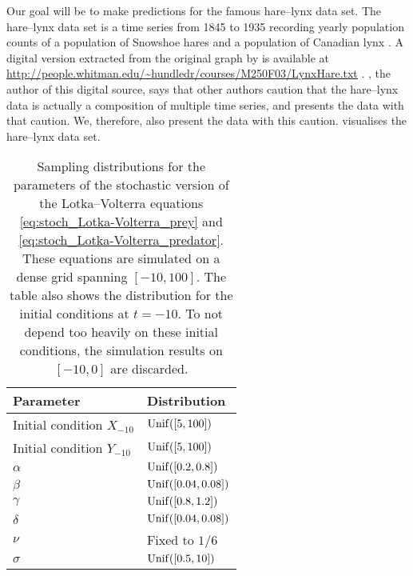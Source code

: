 \documentclass[12pt, twoside]{report}
\begin{document}
Our goal will be to make predictions for the famous hare--lynx data set.
The hare--lynx data set is a time series from 1845 to 1935 recording yearly population counts of a population of Snowshoe hares and a population of Canadian lynx \parencite{MacLulich:1937:Fluctuations_in_the_Numbers_of_the_Varying_Hare}.
A digital version extracted from the original graph by \textcite{MacLulich:1937:Fluctuations_in_the_Numbers_of_the_Varying_Hare}
is available at \url{http://people.whitman.edu/~hundledr/courses/M250F03/LynxHare.txt} \parencite{Hundley:2022:Introduction_to_Mathematical_Modelling}.
\Textcite{Hundley:2022:Introduction_to_Mathematical_Modelling},
the author of this digital source,
says that other authors caution that the hare--lynx data is actually a composition of multiple time series, and presents the data with that caution.
We, therefore, also present the data with this caution.
 visualises the hare--lynx data set.

\begin{table}[t]
    \centering
    \caption[
        Parameters of the stochastic Lotka--Volterra equations
    ]
    {
        Sampling distributions for the parameters of the stochastic version of the Lotka--Volterra equations \eqref{eq:stoch_Lotka-Volterra_prey} and \eqref{eq:stoch_Lotka-Volterra_predator}.
        These equations are simulated on a dense grid spanning $[-10, 100]$.
        The table also shows the distribution for the initial conditions at $t = -10$.
        To not depend too heavily on these initial conditions, the simulation results on $[-10, 0]$ are discarded.
    }
    \label{tab:stoch_Lotka-Volterra_parameters}
    \small
    \begin{tabular}{ll}
        \toprule
        Parameter & Distribution \\ \midrule
        Initial condition $X_{-10}$ & $\operatorname{Unif}([5, 100])$ \\ 
        Initial condition $Y_{-10}$ & $\operatorname{Unif}([5, 100])$ \\
        $\alpha$ & $\operatorname{Unif}([0.2, 0.8])$ \\
        $\beta$ & $\operatorname{Unif}([0.04, 0.08])$ \\
        $\gamma$ & $\operatorname{Unif}([0.8, 1.2])$ \\
        $\delta$ & $\operatorname{Unif}([0.04, 0.08])$ \\
        $\nu$ & Fixed to $1/6$ \\
        $\sigma$ & $\operatorname{Unif}([0.5, 10])$ \\
        \bottomrule
    \end{tabular}
\end{table}
\end{document}
